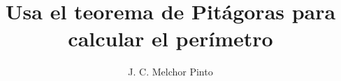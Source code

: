 \documentclass[12pt]{guia}
\title{Usa el teorema de Pitágoras para calcular el perímetro}
\author{J. C. Melchor Pinto}
\begin{document}
\pagestyle{headandfoot}
\addpoints
\INFO
\printanswers

\newpage
\begin{questions}
    
    
    
    
    
    
    
    
\end{questions}
\end{document}
